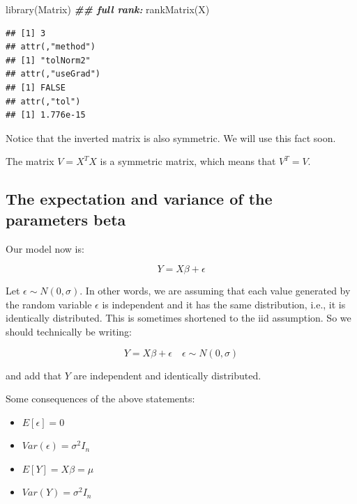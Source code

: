 \documentclass[
  12pt,
]{krantz}
\newenvironment{Shaded}{\begin{snugshade}}{\end{snugshade}}
\newcommand{\DocumentationTok}[1]{\textcolor[rgb]{0.56,0.35,0.01}{\textbf{\textit{#1}}}}
\newcommand{\FunctionTok}[1]{\textcolor[rgb]{0.00,0.00,0.00}{#1}}
\newcommand{\NormalTok}[1]{#1}
\providecommand{\tightlist}{%
  \setlength{\itemsep}{0pt}\setlength{\parskip}{0pt}}
\theoremstyle{definition}
\theoremstyle{definition}
\theoremstyle{definition}
\theoremstyle{definition}
\theoremstyle{remark}
\begin{document}
\begin{Shaded}
\begin{Highlighting}[]
\FunctionTok{library}\NormalTok{(Matrix)}
\DocumentationTok{\#\# full rank:}
\FunctionTok{rankMatrix}\NormalTok{(X)}
\end{Highlighting}
\end{Shaded}

\begin{verbatim}
## [1] 3
## attr(,"method")
## [1] "tolNorm2"
## attr(,"useGrad")
## [1] FALSE
## attr(,"tol")
## [1] 1.776e-15
\end{verbatim}

Notice that the inverted matrix is also symmetric. We will use this fact soon.

The matrix \(V=X^T X\) is a symmetric matrix, which means that \(V^T=V\).

\hypertarget{the-expectation-and-variance-of-the-parameters-beta}{%
\subsection{The expectation and variance of the parameters beta}\label{the-expectation-and-variance-of-the-parameters-beta}}

Our model now is:

\begin{equation}
Y = X\beta + \epsilon
\end{equation}

Let \(\epsilon\sim N(0,\sigma)\). In other words, we are assuming that each value generated by the random variable \(\epsilon\) is independent and it has the same distribution, i.e., it is identically distributed. This is sometimes shortened to the iid assumption. So we should technically be writing:

\begin{equation}
Y = X\beta + \epsilon \quad  \epsilon\sim N(0,\sigma)
\end{equation}

and add that \(Y\) are independent and identically distributed.

Some consequences of the above statements:

\begin{itemize}
\tightlist
\item
  \(E[\epsilon]=0\)
\item
  \(Var(\epsilon)=\sigma^2 I_n\)
\item
  \(E[Y]=X\beta=\mu\)
\item
  \(Var(Y)=\sigma^2 I_n\)
\end{itemize}
\end{document}
